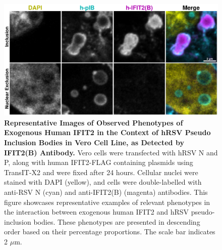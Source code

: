 \begin{figure}
    \centering
    \includegraphics[width=1\linewidth]{09. Chapter 4/Figs/01. pIB/03. IFIT2/04. IFIT2-FLAG/02. IFIT2B/03. i2b-hi2f-hnhp.pdf}
    \caption[Representative Images of Observed Phenotypes of Exogenous Human IFIT2 in the Context of hRSV Pseudo Inclusion Bodies in Vero Cell Line, as Detected by IFIT2(B) Antibody.]{\textbf{Representative Images of Observed Phenotypes of Exogenous Human IFIT2 in the Context of hRSV Pseudo Inclusion Bodies in Vero Cell Line, as Detected by IFIT2(B) Antibody.} Vero cells were transfected with hRSV N and P, along with human IFIT2-FLAG containing plasmids using TransIT-X2 and were fixed after 24 hours. Cellular nuclei were stained with DAPI (yellow), and cells were double-labelled with anti-RSV N (cyan) and anti-IFIT2(B) (magenta) antibodies. This figure showcases representative examples of relevant phenotypes in the interaction between exogenous human IFIT2 and hRSV pseudo-inclusion bodies. These phenotypes are presented in descending order based on their percentage proportions. The scale bar indicates 2 \(\mu \mbox{m}\).}
    \label{fig:Representative Images of Observed Phenotypes of Exogenous Human IFIT2 in the Context of hRSV Pseudo Inclusion Bodies in Vero Cell Line, as Detected by IFIT2(B) Antibody}
\end{figure}


